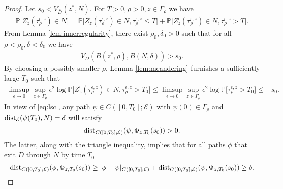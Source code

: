 \documentclass[10pt, reqno]{amsart}
\newcommand{\pr}{\mathbb{P}}
\newcommand{\e}{\mathcal{E}}
\theoremstyle{definition}
\numberwithin{lem}{section}
\numberwithin{cor}{section}
\numberwithin{prop}{section}
\numberwithin{thm}{section}
\numberwithin{dfn}{section}
\begin{document}
\begin{proof}  Let $s_0<V_{\bar{D}}(z^*, N).$ For $T>0, \rho>0, z\in\Gamma_\rho$ we have
\begin{equation*}
    \begin{aligned}       \pr\bigg[Z^\epsilon_z(\tau^{\epsilon,z}_\rho) \in N\bigg]=\pr\bigg[ Z^\epsilon_z(\tau^{\epsilon,z}_\rho) \in N, \tau^{\epsilon,z}_\rho\leq T\bigg]+\pr\bigg[ Z^\epsilon_z(\tau^{\epsilon,z}_\rho) \in N, \tau^{\epsilon,z}_\rho>T\bigg].
    \end{aligned}
\end{equation*}
From Lemma \ref{lem:innerregularity}, there exist $\rho_0, \delta_0>0$ such that for all $\rho<\rho_0, \delta<\delta_0$ we have 
\begin{equation}\label{eq:lsc}
    \begin{aligned}
        V_{\bar{D}}(B(z^*,\rho), B(N, \delta) )>s_0.
    \end{aligned}
\end{equation}
By choosing a possibly smaller $\rho$, Lemma \ref{lem:meandering} furnishes a sufficiently large $T_0$ such that
\begin{equation}\label{eq:largetime}
    \begin{aligned}
       \limsup_{\epsilon\to 0}\sup_{z\in\Gamma_\rho}\epsilon^2\log\pr\bigg[ Z^\epsilon_z(\tau^{\epsilon,z}_\rho) \in N, \tau^{\epsilon,z}_\rho>T_0\bigg]\leq \limsup_{\epsilon\to 0}\sup_{z\in\Gamma_\rho}\epsilon^2\log\pr\bigg[\tau^{\epsilon, z}_\rho>T_0\bigg]\leq -s_0.
    \end{aligned}
\end{equation}
In view of \eqref{eq:lsc},  any path $\psi\in C ([0,T_0];\e)$ with $\psi(0)\in\Gamma_{\rho}$ and $\textnormal{dist}_{\e}(\psi(T_0), N)=\delta$ will satisfy
\begin{equation*}
    \begin{aligned}
 \textnormal{dist}_{C([0,T_0]; \e)}(\psi, \Phi_{z, T_0}(s_0))>0.
    \end{aligned}
\end{equation*}
The latter, along with the triangle inequality, implies that for all paths $\phi$ that exit $D$ through $N$ by time $T_0$
\begin{equation}\label{eq:contradiction}
    \begin{aligned}
 \textnormal{dist}_{C([0,T_0]; \e)}(\phi, \Phi_{z, T_0}(s_0))\geq |\phi-\psi|_{C([0,T_0]; \e)}+\textnormal{dist}_{C([0,T_0]; \e)}(\psi, \Phi_{z, T_0}(s_0))\geq \delta.
    \end{aligned}
\end{equation}



\end{proof}
\end{document}
